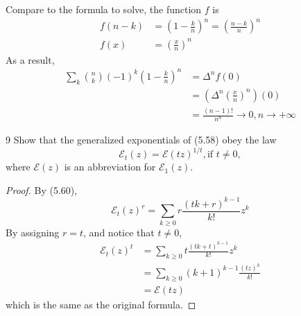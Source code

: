 \documentclass[a4paper,12pt]{article}
\makeatletter
\newtheorem*{solution}{Solution}
\theoremstyle{definition}
\renewenvironment{solution}[1][Solution] {\par\pushQED{\qed}\normalfont\topsep6\p@\@plus6\p@\relax\trivlist\item[\hskip\labelsep\bfseries#1\@addpunct{.}]\ignorespaces}{\popQED\endtrivlist\@endpefalse} \makeatother
\newenvironment{problems}{\begin{list}{}{\renewcommand{\makelabel}[1]{\textbf{##1}\hfil}}}{\end{list}}
\makeatother
\begin{document}
\begin{problems}
\begin{solution}
\begin{equation*}
       \end{equation*}
       Compare to the formula to solve, the function $f$ is
       \begin{align*}
           f(n-k) &= \left(1-\frac{k}{n}\right)^n = \left(\frac{n-k}{n}\right)^n \\
           f(x) &= \left(\frac{x}{n}\right)^n
       \end{align*}
       As a result,
       \begin{align*}
        \sum_k\binom{n}{k}(-1)^k\left(1-\frac{k}{n}\right)^n &= \Delta^n f(0) \\&= \left(\Delta^n \left(\frac{x}{n}\right)^n\right)(0) \\&= \frac{(n-1)!}{n^n} \rightarrow 0, n\rightarrow +\infty
       \end{align*}
   \end{solution}
   \item[9] Show that the generalized exponentials of (5.58) obey the law
   \begin{equation*}
        \mathcal{E}_t(z) =\mathcal{E}(tz)^{1/t},\text{if }t\neq 0,
   \end{equation*}
    where $\mathcal{E}(z)$ is an abbreviation for $\mathcal{E}_1(z)$.
    \begin{proof}
        By (5.60),
        \begin{equation*}
            \mathcal{E}_t(z)^r = \sum_{k\geq 0} r \frac{(tk+r)^{k-1}}{k!} z^k
        \end{equation*}
        By assigning $r=t$, and notice that $t\neq 0$,
        \begin{align*}
            \mathcal{E}_t(z)^t &= \sum_{k\geq 0} t \frac{(tk+t)^{k-1}}{k!} z^k \\
                &= \sum_{k\geq 0} (k+1)^{k-1}\frac{(tz)^k}{k!} \\
                &= \mathcal{E}(tz)
        \end{align*}
        which is the same as the original formula.
    \end{proof}
\end{problems}
\end{document}
